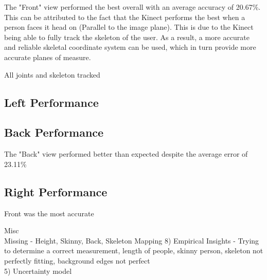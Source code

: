 The "Front" view performed the best overall with an average accuracy of 20.67\%. This can be attributed to the fact that the Kinect performs the best when a person faces it head on (Parallel to the image plane). This is due to the Kinect being able to fully track the skeleton of the user. As a result, a more accurate and reliable skeletal coordinate system can be used, which in turn provide more accurate planes of measure. 

All joints and skeleton tracked 

\subsection{Left Performance}

\subsection{Back Performance}

The "Back" view performed better than expected despite the average error of 23.11\%

\subsection{Right Performance}

Front was the most accurate

Misc\\
Missing - Height, Skinny, Back, Skeleton Mapping
8) Empirical Insights - Trying to determine a correct measurement,  length of people, skinny person, skeleton not perfectly fitting, background edges not perfect \\

5) Uncertainty model\\

\fi